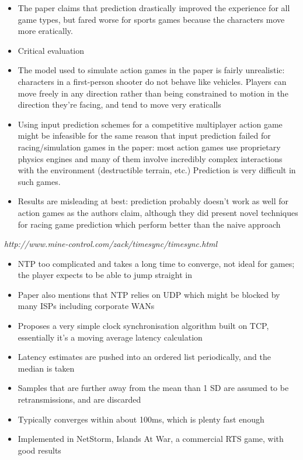 \documentclass[conference]{IEEEtran}
\begin{document}
\begin{itemize}
		\item The paper claims that prediction drastically improved the experience for all game types, but fared worse for sports games because the characters move more eratically.
		\item Critical evaluation
		\item The model used to simulate action games in the paper is fairly unrealistic: characters in a first-person shooter do not behave like vehicles. Players can move freely in any direction rather than being constrained to motion in the direction they're facing, and tend to move very eraticalls
		\item Using input prediction schemes for a competitive multiplayer action game might be infeasible for the same reason that input prediction failed for racing/simulation games in the paper: most action games use proprietary physics engines and many of them involve incredibly complex interactions with the environment (destructible terrain, etc.) Prediction is very difficult in such games.
		\item Results are misleading at best: prediction probably doesn't work as well for action games as the authors claim, although they did present novel techniques for racing game prediction which perform better than the naive approach
	\end{itemize}

	\emph{http://www.mine-control.com/zack/timesync/timesync.html}

	\begin{itemize}
		\item NTP too complicated and takes a long time to converge, not ideal for games; the player expects to be able to jump straight in
		\item Paper also mentions that NTP relies on UDP which might be blocked by many ISPs including corporate WANs
		\item Proposes a very simple clock synchronisation algorithm built on TCP, essentially it's a moving average latency calculation
		\item Latency estimates are pushed into an ordered list periodically, and the median is taken
		\item Samples that are further away from the mean than 1 SD are assumed to be retransmissions, and are discarded
		\item Typically converges within about 100ms, which is plenty fast enough
		\item Implemented in NetStorm, Islands At War, a commercial RTS game, with good results
	\end{itemize}
\end{document}

